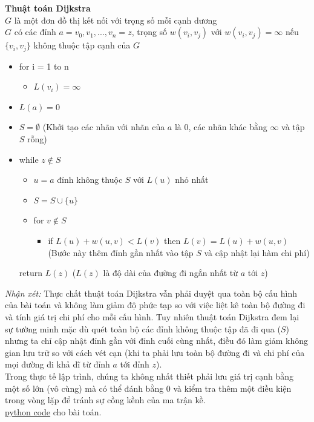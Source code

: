 \begin{tcolorbox}[colframe=gray,colback=gray!20,left=10pt,right=10pt,top=10pt,bottom=10pt]
    \textbf{Thuật toán Dijkstra} \\
    $G$ là một đơn đồ thị kết nối với trọng số mỗi cạnh dương \\
    $G$ có các đỉnh $a = v_0, v_1, ..., v_n = z$, trọng số 
    $w(v_i, v_j)$ với $w(v_i, v_j) = \infty$ nếu $\{v_i, v_j\}$ không thuộc 
    tập cạnh của $G$

    \begin{itemize}
        \item [] for i = 1 to n 
        \begin{itemize}
            \item [] $L(v_i) = \infty$
        \end{itemize} 
        \item [] $L(a) = 0$
        \item [] $S = \emptyset $ (Khởi tạo các nhãn với nhãn của $a$ là $0$, 
        các nhãn khác bằng $\infty$ và tập $S$ rỗng)
        \item [] while $z \notin S$
        \begin{itemize}
          \item [] $u = a$ đỉnh không thuộc $S$ với $L(u)$ nhỏ nhất
          \item [] $S = S \cup \{u\}$
          \item [] for $v \notin S$
          \begin{itemize}
            \item [] if $L(u) + w(u,v) < L(v)$ then $L(v) = L(u) + w(u,v)$
            (Bước này thêm đỉnh gần nhất vào tập $S$ và cập nhật lại hàm chi phí)
          \end{itemize}
        \end{itemize}
        return $L(z)$ ($L(z)$ là độ dài của đường đi ngắn nhất từ $a$ tới $z$)
    \end{itemize}
  \end{tcolorbox}

\textit{Nhận xét: } Thực chất thuật toán Dijkstra vẫn phải duyệt qua toàn bộ cấu 
hình của bài toán và không làm giảm độ phức tạp so với việc liệt kê toàn bộ đường
đi và tính giá trị chi phí cho mỗi cấu hình. Tuy nhiên thuật toán Dijkstra đem lại
sự tường minh mặc dù quét toàn bộ các đỉnh không thuộc tập đã đi qua ($S$) nhưng 
ta chỉ cập nhật đỉnh gần với đỉnh cuối cùng nhất, điều đó làm giảm không gian lưu 
trữ so với cách vét cạn (khi ta phải lưu toàn bộ đường đi và chi phí của mọi đường
đi khả dĩ từ đỉnh $a$ tới đỉnh $z$). \\

Trong thực tế lập trình, chúng ta không nhất thiết phải lưu giá trị cạnh bằng một 
số lớn (vô cùng) mà có thể đánh bằng $0$ và kiểm tra thêm một điều kiện trong vòng 
lặp để tránh sự cồng kềnh của ma trận kề. \\

\href{https://github.com/batman0911/dma_homework/blob/master/hw_02/src/shortest_path.ipynb}{python code} 
    cho bài toán.
